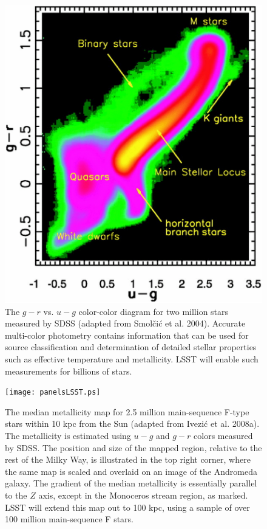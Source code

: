 \documentclass{emulateapj}
\begin{document}
\begin{figure}
\includegraphics[width=1.0\hsize,clip]{smolcic.ps}
\caption{The $g-r$ vs. $u-g$ color-color diagram for two million stars measured by 
SDSS (adapted from Smol\v{c}i\'{c} et al. 2004). Accurate multi-color photometry 
contains information that can be used for source classification and determination of 
detailed stellar properties such as effective temperature and metallicity. LSST will 
enable such measurements for billions of stars.} 
\label{Fig:FeH}
\end{figure}

\begin{figure}
\texttt{[image: panelsLSST.ps]}
\caption{
The median metallicity map for 2.5 million main-sequence F-type stars within 10 kpc 
from the Sun (adapted from Ivezi\'{c} et al. 2008a). The metallicity is estimated using 
$u-g$ and $g-r$ colors measured by SDSS. The position and size of the mapped 
region, relative to the rest of the Milky Way, is illustrated in the top right 
corner, where the same map is scaled and overlaid on an image of the Andromeda 
galaxy. The gradient of the median metallicity is essentially parallel
to the $Z$ axis, except in the Monoceros stream region, as marked. LSST 
will extend this map out to 100 kpc, using a sample of over 100 million 
main-sequence F stars.} 
\label{Fig:FeH3}
\end{figure}
\end{document}

